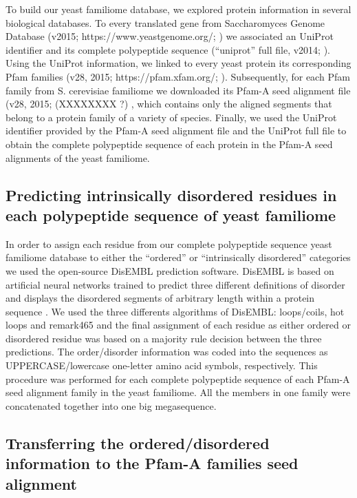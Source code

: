 \documentclass[preprint,12pt]{elsarticle}
\begin{document}
To build our yeast familiome database, we explored protein information in several biological databases. To every translated gene from Saccharomyces Genome Database (v2015; https://www.yeastgenome.org/; \cite{cherry2012saccharomyces}) we associated an UniProt identifier and its complete polypeptide sequence (“uniprot” full file, v2014; \cite{gene2015gene}). Using the UniProt information, we linked to every yeast protein its corresponding  Pfam families (v28, 2015; https://pfam.xfam.org/;  \cite{bateman1999pfam}  \cite{punta2011pfam}). Subsequently, for each Pfam family from S. cerevisiae familiome we downloaded its Pfam-A seed alignment file (v28, 2015; \cite{sonnhammer1997pfam} \cite{punta2011pfam} (XXXXXXXX ?) , which contains only the aligned segments that belong to a protein family of a variety of species. Finally, we used the UniProt identifier provided by the Pfam-A seed alignment file and the UniProt full file to obtain the complete polypeptide sequence of each protein in the Pfam-A seed alignments of the yeast familiome. 



\subsection{Predicting intrinsically disordered residues in each polypeptide sequence of yeast familiome}

In order to assign each residue from our complete polypeptide sequence yeast familiome database to either the “ordered” or “intrinsically disordered” categories we used the open-source DisEMBL prediction software. DisEMBL is  based on artificial neural networks trained to predict three different definitions of disorder and displays  the disordered segments of arbitrary length within a protein sequence \cite{linding2003protein}. We used the three differents algorithms of DisEMBL: loops/coils, hot loops and remark465 and the final assignment of each residue as either ordered  or  disordered residue  was based on a majority rule decision between the three predictions. The order/disorder information was coded into the sequences as UPPERCASE/lowercase one-letter amino acid symbols, respectively. This procedure was performed for each complete polypeptide sequence of each Pfam-A seed alignment family in the yeast familiome. All the members in one family were concatenated together into one big megasequence.
 

\subsection{Transferring the ordered/disordered information to the Pfam-A families seed alignment}
\end{document}
